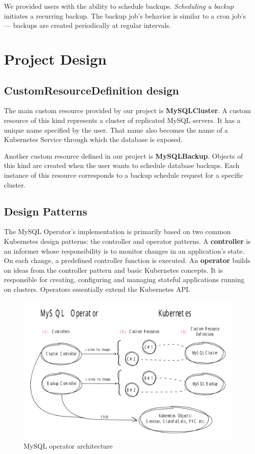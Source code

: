 We provided users with the ability to schedule backups. \textit{Scheduling a backup} initiates a
recurring backup. The backup job’s behavior is similar to a cron job’s --- backups are created
periodically at regular intervals.

\section{Project Design}

\subsection{CustomResourceDefinition design}
The main custom resource provided by our project is \textbf{MySQLCluster}. A custom resource of this kind
represents a cluster of replicated MySQL servers. It has a unique name specified by the user.
That name also becomes the name of a Kubernetes Service through which the database is exposed.

Another custom resource defined in our project is \textbf{MySQLBackup}. Objects of this kind are created when
the user wants to schedule database backups. Each instance of this resource corresponds to a backup
schedule request for a specific cluster.

\subsection{Design Patterns}
The MySQL Operator’s implementation is primarily based on two common Kubernetes design patterns:
the controller and operator patterns. A \textbf{controller} is an informer whose responsibility is
to monitor changes in an application’s state. On each change, a predefined controller function is
executed. An \textbf{operator} builds on ideas from the controller pattern and basic Kubernetes
concepts. It is responsible for creating, configuring and managing stateful applications running on
clusters. Operators essentially extend the Kubernetes API.

\begin{figure}[!ht]
    \centering
    \includegraphics[width=1\textwidth, angle=0]{img/Design.pdf}
    \caption{MySQL operator architecture}
    \label{fig:design}
\end{figure}

